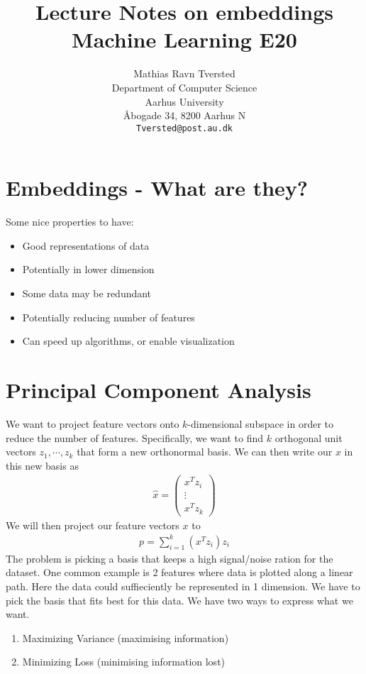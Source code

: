 \documentclass{article}
\title{Lecture Notes on embeddings\\Machine Learning E20}
\author{
 Mathias Ravn Tversted \\
  Department of Computer Science\\
  Aarhus University\\
  Åbogade 34, 8200 Aarhus N \\
  \texttt{Tversted@post.au.dk} \\
}
\begin{document}
\maketitle
\tableofcontents
\newpage

\section{Embeddings - What are they?}
  Some nice properties to have:
  \begin{itemize}
    \item Good representations of data
    \item Potentially in lower dimension
    \item Some data may be redundant
    \item Potentially reducing number of features
    \item Can speed up algorithms, or enable visualization
  \end{itemize}

\section{Principal Component Analysis}
  We want to project feature vectors onto $k$-dimensional subspace in order to reduce the number of features. Specifically, we want to find $k$ orthogonal unit vectors $z_1, \cdots, z_k$ that form a new orthonormal basis. We can then write our $x$ in this new basis as 
  \begin{align}
    \hat{x} = \begin{pmatrix}
      x^T z_i\\
      \vdots\\
      x^T z_k
    \end{pmatrix}
  \end{align}
  We will then project our feature vectors $x$ to 
  \begin{align}
    p = \sum_{i=1}^{k}(x^T z_i)z_i
  \end{align}
  The problem is picking a basis that keeps a high signal/noise ration for the dataset.
  One common example is 2 features where data is plotted along a linear path. Here the data could suffieciently be represented in 1 dimension.
  We have to pick the basis that fits best for this data. We have two ways to express what we want.\\
  \begin{enumerate}
    \item Maximizing Variance (maximising information)
    \item Minimizing Loss (minimising information lost)
  \end{enumerate}
\end{document}
